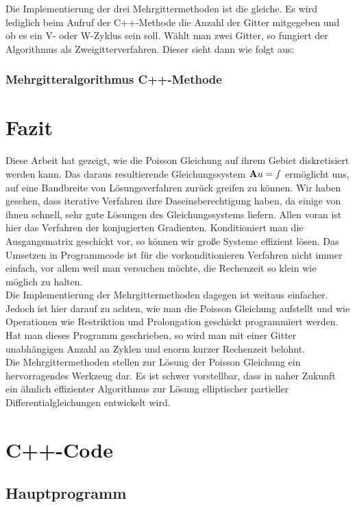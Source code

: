 Die Implementierung der drei Mehrgittermethoden ist die gleiche. Es wird lediglich beim Aufruf der C++-Methode die Anzahl der Gitter mitgegeben und ob es ein V- oder W-Zyklus sein soll. Wählt man zwei Gitter, so fungiert der Algorithmus als Zweigitterverfahren. Dieser sieht dann wie folgt aus:

\subsection{Mehrgitteralgorithmus C++-Methode}\label{s.mgm}

\chapter{Fazit}

Diese Arbeit hat gezeigt, wie die Poisson Gleichung auf ihrem Gebiet diskretisiert werden kann. Das daraus resultierende Gleichungssystem ${\textbf{A}} u = f$ ermöglicht uns, auf eine Bandbreite von Lösungsverfahren zurück greifen zu können. Wir haben gesehen, dass iterative Verfahren ihre Daseinsberechtigung haben, da einige von ihnen schnell, sehr gute Lösungen des Gleichungssystems liefern. Allen voran ist hier das Verfahren der konjugierten Gradienten. Konditioniert man die Ausgangsmatrix geschickt vor, so können wir große Systeme effizient lösen. Das Umsetzen in Programmcode ist für die vorkonditionieren Verfahren nicht immer einfach, vor allem weil man versuchen möchte, die Rechenzeit so klein wie möglich zu halten.\\
Die Implementierung der Mehrgittermethoden dagegen ist weitaus einfacher. Jedoch ist hier darauf zu achten, wie man die Poisson Gleichung aufstellt und wie Operationen wie Restriktion und Prolongation geschickt programmiert werden. Hat man dieses Programm geschrieben, so wird man mit einer Gitter unabhängigen Anzahl an Zyklen und enorm kurzer Rechenzeit belohnt.\\
Die Mehrgittermethoden stellen zur Lösung der Poisson Gleichung ein hervorragendes Werkzeug dar. Es ist schwer vorstellbar, dass in naher Zukunft ein ähnlich effizienter Algorithmus zur Lösung elliptischer partieller Differentialgleichungen entwickelt wird.

\chapter{C++-Code}
\section{Hauptprogramm}
